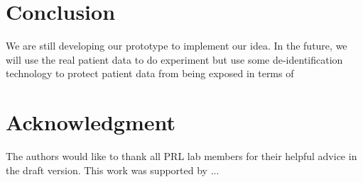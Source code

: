 \documentclass[conference]{IEEEtran}
\begin{document}
\section{Conclusion}
\label{conclude}

We are still developing our prototype to implement our idea.
In the future, we will use the real patient data to do experiment but use some de-identification technology to protect patient data from being exposed in terms of  

\section*{Acknowledgment}
The authors would like to thank all PRL lab members for their helpful advice in the draft version.  This work was supported by ...



\end{document}
